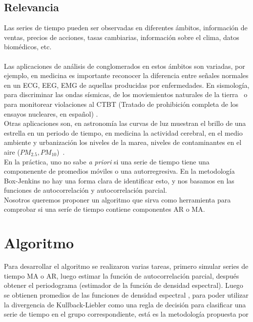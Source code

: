 \documentclass[12pt,oneside]{book}
\begin{document}
\section{Relevancia} %
\label{sec:relevancia}
Las series de tiempo pueden ser observadas en diferentes \'ambitos, informaci\'on de ventas, precios de acciones, tasas cambiarias, informaci\'on sobre el clima, datos biom\'edicos, etc. ~\cite{TIME_SERIES_CLUSTERING}\\\\
Las aplicaciones de an\'alisis de conglomerados en estos \'ambitos son variadas, por ejemplo, en medicina es importante reconocer la diferencia entre se\~nales normales en un ECG, EEG, EMG de aquellas producidas por enfermedades. En sismolog\'ia, para discriminar las ondas s\'ismicas, de los moviemientos naturales de la tierra~\cite{TIME_SERIES_CLUSTERING_2} o para monitorear violaciones al CTBT (Tratado de prohibici\'on completa de los ensayos nucleares, en espa\~nol) \cite{SUBJ_SP1}.\\

Otras aplicaciones son, en astronom\'ia las curvas de luz muestran el brillo de una estrella en un periodo de tiempo, en medicina la actividad cerebral, en el medio ambiente y urbanizaci\'on los niveles de la marea, niveles de contaminantes en el aire ($PM_{2.5}, PM_{10}$)~\cite{TIME_SERIES_CLUSTERING}.\\

En la pr\'actica, uno no sabe \textit{a priori} si una serie de tiempo tiene una componenente de promedios m\'oviles o una autorregresiva. En la metodolog\'ia Box-Jenkins no hay una forma clara de identificar esto, y nos basamos en las funciones de autocorrelaci\'on y autocorrelaci\'on parcial.\\

Nosotros queremos proponer un algoritmo que sirva como herramienta para comprobar si una ser\'ie de tiempo contiene componentes AR o MA.


 \chapter{Algoritmo} %
 \label{cha:algoritmo}
 Para desarrollar el algoritmo se realizaron varias tareas, primero simular series de tiempo MA o AR, luego estimar la funci\'on de autocorrelaci\'on parcial, despu\'es obtener el periodograma (estimador de la funci\'on de densidad espectral). Luego se obtienen promedios de las funciones de densidad espectral \cite{SUBJ_SP1}, para poder utilizar la divergencia de Kullback-Liebler como una regla de decisi\'on para clasificar una serie de tiempo en el grupo correspondiente, est\'a es la metodolog\'ia propuesta por \cite{SUBJ_SP2}
\end{document}
